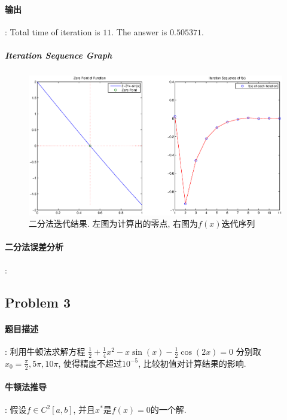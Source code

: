 \documentclass{article}
\begin{document}
\begin{CJK*}{UTF8}{song}
			\paragraph{输出}
			:\newline
				Total time of iteration is $11$. The answer is $0.505371$.
				\subparagraph{Iteration Sequence Graph}
				\begin{figure}[H]
					\centering
					\includegraphics[width=1.0\textwidth]{../chapter_2_1_1.eps}
					\caption{二分法迭代结果. 左图为计算出的零点, 右图为$f\left(x\right)$迭代序列}
					\label{img_chapter2_1_1}
				\end{figure}
			\paragraph{二分法误差分析}
			:\newline	
		\subsection{Problem 3}
			\paragraph{题目描述}
			:\newline
				利用牛顿法求解方程\newline
				$\frac{1}{2} + \frac{1}{4}x^2 - x\sin\left(x\right) - \frac{1}{2}\cos\left(2x\right) = 0$
				分别取$x_0 = \frac{\pi}{2},5\pi,10\pi$, 使得精度不超过$10^{-5}$, 比较初值对计算结果的影响.
			\paragraph{牛顿法推导}:\newline
				假设$f\in C^2\left[a,b\right]$, 并且$x^{*}$是$f\left(x \right) = 0$的一个解.
			

\end{CJK*}
\end{document}
